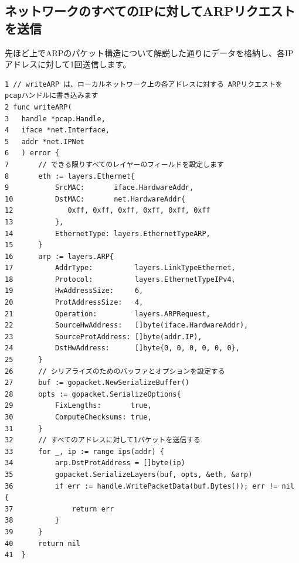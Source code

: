 \subsection{ネットワークのすべてのIPに対してARPリクエストを送信}
先ほど上でARPのパケット構造について解説した通りにデータを格納し、各IPアドレスに対して1回送信します。
\begin{tcolorbox}[breakable]
    \begin{verbatim}
1 // writeARP は、ローカルネットワーク上の各アドレスに対する ARPリクエストを pcapハンドルに書き込みます
2 func writeARP(
3   handle *pcap.Handle, 
4   iface *net.Interface, 
5   addr *net.IPNet
6   ) error {
7       // できる限りすべてのレイヤーのフィールドを設定します
8       eth := layers.Ethernet{
9		    SrcMAC:       iface.HardwareAddr,
10	        DstMAC:       net.HardwareAddr{
12             0xff, 0xff, 0xff, 0xff, 0xff, 0xff
13          },
14          EthernetType: layers.EthernetTypeARP,
15      }
16      arp := layers.ARP{
17          AddrType:          layers.LinkTypeEthernet,
18	        Protocol:          layers.EthernetTypeIPv4,
19	        HwAddressSize:     6,
20	        ProtAddressSize:   4,
21	        Operation:         layers.ARPRequest,
22	        SourceHwAddress:   []byte(iface.HardwareAddr),
23	        SourceProtAddress: []byte(addr.IP),
24	        DstHwAddress:      []byte{0, 0, 0, 0, 0, 0},
25      }
26      // シリアライズのためのバッファとオプションを設定する
27      buf := gopacket.NewSerializeBuffer()
28      opts := gopacket.SerializeOptions{
29		    FixLengths:       true,
30	        ComputeChecksums: true,
31	    }
32	    // すべてのアドレスに対して1パケットを送信する
33	    for _, ip := range ips(addr) {
34		    arp.DstProtAddress = []byte(ip)
35		    gopacket.SerializeLayers(buf, opts, &eth, &arp)
36		    if err := handle.WritePacketData(buf.Bytes()); err != nil {
37			    return err
38		    }
39	    }
40	    return nil
41  }
    \end{verbatim}
\end{tcolorbox}

